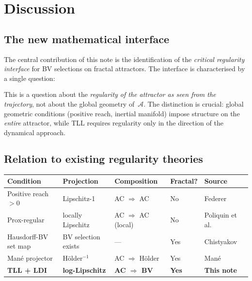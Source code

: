 \documentclass[12pt,a4paper]{article}
\theoremstyle{definition}
\theoremstyle{plain}
\theoremstyle{remark}
\begin{document}
\section{Discussion}
\label{sec:discussion}

\subsection{The new mathematical interface}

The central contribution of this note is the identification of
the \emph{critical regularity interface} for BV selections on
fractal attractors.  The interface is characterised by a single
question:

\begin{center}
\end{center}

\noindent
This is a question about the \emph{regularity of the attractor as
seen from the trajectory}, not about the global geometry
of~$\mathcal{A}$.  The distinction is crucial: global geometric
conditions (positive reach, inertial manifold) impose structure
on the \emph{entire} attractor, while TLL requires regularity
only in the direction of the dynamical approach.

\subsection{Relation to existing regularity theories}

\begin{center}
\begin{tabular}{lllll}
\hline
\textbf{Condition} & \textbf{Projection} & \textbf{Composition}
  & \textbf{Fractal?} & \textbf{Source} \\
\hline
Positive reach $> 0$
  & Lipschitz-1
  & AC $\Rightarrow$ AC
  & No
  & Federer~\cite{Federer1959} \\
Prox-regular
  & locally Lipschitz
  & AC $\Rightarrow$ AC (local)
  & No
  & Poliquin et al.~\cite{PoliquinRockafellarThibault2000} \\
Hausdorff-BV set map
  & BV selection exists
  & ---
  & Yes
  & Chistyakov~\cite{Chistyakov2004} \\
Man\'e projector
  & H\"older${}^{-1}$
  & AC $\Rightarrow$ H\"older
  & Yes
  & Man\'e~\cite{Mane1981} \\
\textbf{TLL + LDI}
  & \textbf{log-Lipschitz}
  & \textbf{AC $\Rightarrow$ BV}
  & \textbf{Yes}
  & \textbf{This note} \\
\hline
\end{tabular}
\end{center}
\end{document}
